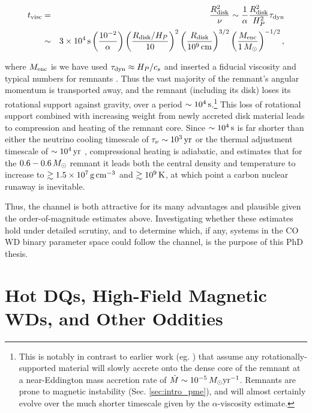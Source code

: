 {\begin{eqnarray}
t_\mrm{visc} &=& \frac{R_\mrm{disk}^2}{\nu} \sim \frac{1}{\alpha}\frac{R_\mrm{disk}^2}{H_P^2}\taudyn \nonumber \\
			&\sim& 3\times10^4\,\mrm{s}\left(\frac{10^{-2}}{\alpha}\right)\left(\frac{R_\mrm{disk}/H_P}{10}\right)^2\left(\frac{R_\mrm{disk}}{10^9\,\mrm{cm}}\right)^{3/2}\left(\frac{M_\mrm{enc}}{1\,\Msun}\right)^{-1/2},
\end{eqnarray}

\noindent where $M_\mathrm{enc}$ is we have used $\taudyn \approx H_P/c_s$ and inserted a fiducial viscosity and typical numbers for remnants \citep{shen+12}.  Thus the vast majority of the remnant's angular momentum is transported away, and the remnant (including its disk) loses its rotational support against gravity, over a period $\sim10^4\,\mathrm{s}$.\footnote{This is notably in contrast to earlier work (eg. \citep{nomoi85, yoonpr07}) that assume any rotationally-supported material will slowly accrete onto the dense core of the remnant at a near-Eddington mass accretion rate of $\dot{M} \sim 10^{-5}\,\Msun\pyr$.  Remnants are prone to magnetic instability (Sec. \ref{sec:intro_pme}), and will almost certainly evolve over the much shorter timescale given by the $\alpha$-viscosity estimate.}  This loss of rotational support combined with increasing weight from newly accreted disk material leads to compression and heating of the remnant core.  Since $\sim10^4\,\mathrm{s}$ is far shorter than either the neutrino cooling timescale of $\taunu \sim 10^3\,\mrm{yr}$ or the thermal adjustment timescale of $\sim10^4\,\mathrm{yr}$ \citep{shen+12}, compressional heating is adiabatic, and \citeal{vkercj10} estimates that for the $0.6-0.6\,\Msun$ remnant it leads both the central density and temperature to increase to $\gtrsim1.5\times10^7\,\gcc$ and $\gtrsim10^9\,\mathrm{K}$, at which point a carbon nuclear runaway is inevitable.

Thus, the \citeal{vkercj10} channel is both attractive for its many advantages and plausible given the order-of-magnitude estimates above.  Investigating whether these estimates hold under detailed scrutiny, and to determine which, if any, systems in the CO WD binary parameter space could follow the channel, is the purpose of this PhD thesis.

\section{Hot DQs, High-Field Magnetic WDs, and Other Oddities}

}

